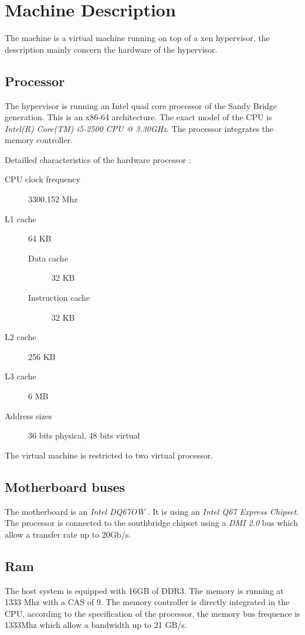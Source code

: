\section{Machine Description}
The machine is a virtual machine running on top of a xen hypervisor, the
description mainly concern the hardware of the hypervisor.

\subsection{Processor}
The hypervisor is running an Intel quad core processor of the Sandy Bridge generation.
This is an x86-64 architecture.
The exact model of the CPU is \emph{Intel(R) Core(TM) i5-2500 CPU @ 3.30GHz}. \cite{intel-i5-2500}
The processor integrates the memory controller.

Detailled characteristics of the hardware processor :
\begin{description}
\item[CPU clock frequency] 3300.152 Mhz
\item[L1 cache] 64 KB
\begin{description}
\item[Data cache] 32 KB
\item[Instruction cache] 32 KB
\end{description}
\item[L2 cache] 256 KB
\item[L3 cache] 6 MB
\item[Address sizes] 36 bits physical, 48 bits virtual
\end{description}
The virtual machine is restricted to two virtual processor.

\subsection{Motherboard buses}
The motherboard is an \emph{Intel DQ67OW} \cite{dq670w-motherboard}. It is using an \emph{Intel Q67
Express Chipset}. \cite{q67-chipset}
The processor is connected to the southbridge chipset using a \emph{DMI 2.0} bus which
allow a transfer rate up to 20Gb/s.

\subsection{Ram}
The host system is equipped with 16GB of DDR3.
The memory is running at 1333 Mhz with a CAS of 9.
The memory controller is directly integrated in the CPU, according to the
specification of the processor, the memory bus frequence is 1333Mhz which allow a bandwidth up
to 21 GB/s. \cite{intel-i5-2500}


